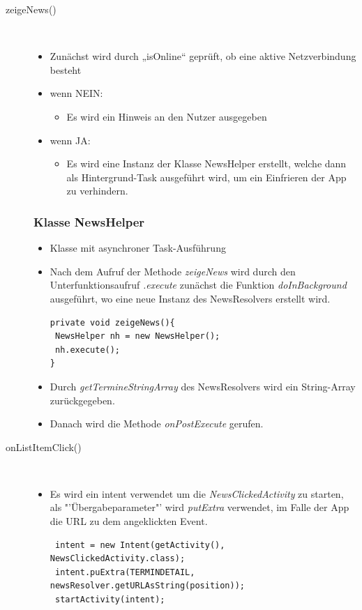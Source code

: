 \begin{description}
\item[zeigeNews()]~\par
\begin{itemize}
\item Zunächst wird durch „isOnline“ geprüft, ob eine aktive Netzverbindung besteht
\item wenn NEIN:
\begin{itemize}
\item Es wird ein Hinweis an den Nutzer ausgegeben
\end{itemize}
\item wenn JA: 
\begin{itemize}
\item Es wird eine Instanz der Klasse NewsHelper erstellt, welche dann als Hintergrund-Task ausgeführt wird, um ein Einfrieren der App zu verhindern.
\end{itemize}
\end{itemize}
\subsubsection{Klasse NewsHelper}
\begin{itemize}
\item Klasse mit asynchroner Task-Ausführung
\item Nach dem Aufruf der Methode \textit{zeigeNews} wird durch den Unterfunktionsaufruf \textit{.execute} zunächst die Funktion \textit{doInBackground} ausgeführt, wo eine neue Instanz des NewsResolvers erstellt wird.
\begin{lstlisting} 
private void zeigeNews(){
 NewsHelper nh = new NewsHelper();
 nh.execute();
}
\end{lstlisting}   
\item Durch \textit{getTermineStringArray} des NewsResolvers wird ein String-Array zurückgegeben.
\item Danach wird die Methode \textit{onPostExecute} gerufen.
\end{itemize}
\item[onListItemClick()]~\par
\begin{itemize}
\item Es wird ein intent verwendet um die \textit{NewsClickedActivity} zu starten, als "'Übergabeparameter"' wird \textit{putExtra} verwendet, im Falle der App die URL zu dem angeklickten Event.
\begin{lstlisting}
 intent = new Intent(getActivity(), NewsClickedActivity.class);
 intent.puExtra(TERMINDETAIL, newsResolver.getURLAsString(position));
 startActivity(intent);
\end{lstlisting}
\end{itemize}


\end{description}
